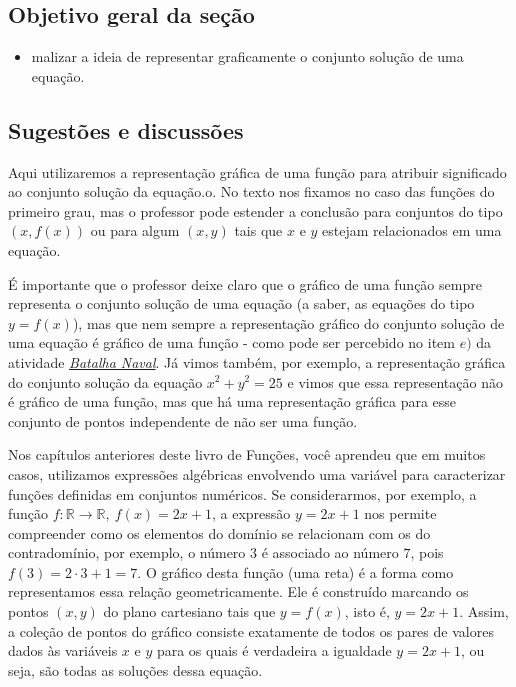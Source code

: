 \clearpage
\def\currentcolor{session4}
\begin{texto}
{
  \subsection{Objetivo geral da seção}
  \begin{itemize}
  \item malizar a ideia de representar graficamente o conjunto solução de uma equação.
  \end{itemize}
  \subsection{Sugestões e discussões}

Aqui utilizaremos a representação gráfica de uma função para atribuir significado ao conjunto solução da equação.o. No texto nos fixamos no caso das funções do primeiro grau, mas o professor pode estender a conclusão para conjuntos do tipo $(x,f(x))$ ou para algum $(x,y)$ tais que $x$ e $y$ estejam relacionados em uma equação.

É importante que o professor deixe claro que o gráfico de uma função sempre representa o conjunto solução de uma equação (a saber, as equações do tipo $y=f(x)$), mas que nem sempre a representação gráfico do conjunto solução de uma equação é gráfico de uma função - como pode ser percebido no item $e)$ da atividade \hyperref[batalha-naval]{\textit{Batalha Naval}}. Já vimos também, por exemplo, a representação gráfica do conjunto solução da equação $x^2+y^2=25$ e vimos que essa representação não é gráfico de uma função, mas que há uma representação gráfica para esse conjunto de pontos independente de não ser uma função.
}
\end{texto}
\label{\detokenize{AF107-1:organizando-taxa-de-variacao-media}}\label{\detokenize{AF107-1::doc}}


Nos capítulos anteriores deste livro de Funções, você aprendeu que em muitos casos, utilizamos expressões algébricas envolvendo uma variável para caracterizar funções definidas em conjuntos numéricos. Se considerarmos, por exemplo, a função $f: \mathbb{R} \to \mathbb{R}, \ f(x) = 2x+1$, a expressão $y=2x+1$ nos permite compreender como os elementos do domínio se relacionam com os do contradomínio, por exemplo, o número $3$ é associado ao número $7$, pois $f(3) = 2\cdot 3+1 = 7$. O gráfico desta função (uma reta) é a forma como representamos essa relação geometricamente. Ele é construído marcando os pontos $(x,y)$ do plano cartesiano tais que $y = f(x)$, isto é, $y = 2x+1$. Assim, a coleção de pontos do gráfico consiste exatamente de todos os pares de valores dados às variáveis $x$ e $y$ para os quais é verdadeira a igualdade $y = 2x + 1$, ou seja, são todas as soluções dessa equação.


